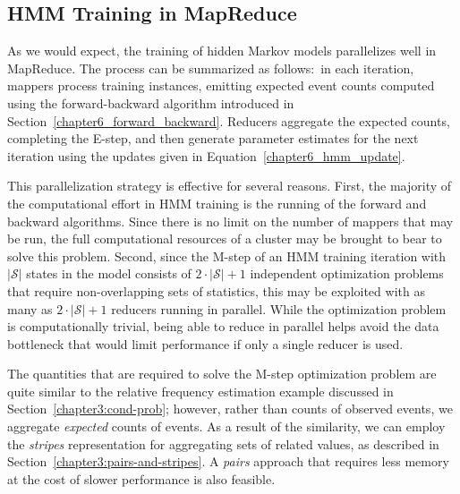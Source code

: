 \subsection{HMM Training in MapReduce}

As we would expect, the training of hidden Markov models parallelizes
well in MapReduce.  The process can be summarized as follows:\ in each
iteration, mappers process training instances, emitting expected event
counts computed using the forward-backward algorithm introduced in
Section~\ref{chapter6_forward_backward}.  Reducers aggregate the
expected counts, completing the E-step, and then generate parameter
estimates for the next iteration using the updates given in
Equation~\ref{chapter6_hmm_update}.

This parallelization strategy is effective for several reasons.
First, the majority of the computational effort in HMM training is the
running of the forward and backward algorithms.  Since there is no
limit on the number of mappers that may be run, the full computational
resources of a cluster may be brought to bear to solve this problem.
Second, since the M-step of an HMM training iteration with
$|\mathcal{S}|$ states in the model consists of $2\cdot |\mathcal{S}|
+ 1$ independent optimization problems that require non-overlapping
sets of statistics, this may be exploited with as many as $2\cdot
|\mathcal{S}| + 1$ reducers running in parallel.  While the
optimization problem is computationally trivial, being able to reduce
in parallel helps avoid the data bottleneck that would limit
performance if only a single reducer is used.

The quantities that are required to solve the M-step optimization
problem are quite similar to the relative frequency estimation example
discussed in Section~\ref{chapter3:cond-prob}; however, rather than
counts of observed events, we aggregate \emph{expected} counts of
events.  As a result of the similarity, we can employ the \emph{
  stripes} representation for aggregating sets of related values, as
described in Section~\ref{chapter3:pairs-and-stripes}.  A \emph{pairs}
approach that requires less memory at the cost of slower performance
is also feasible.

